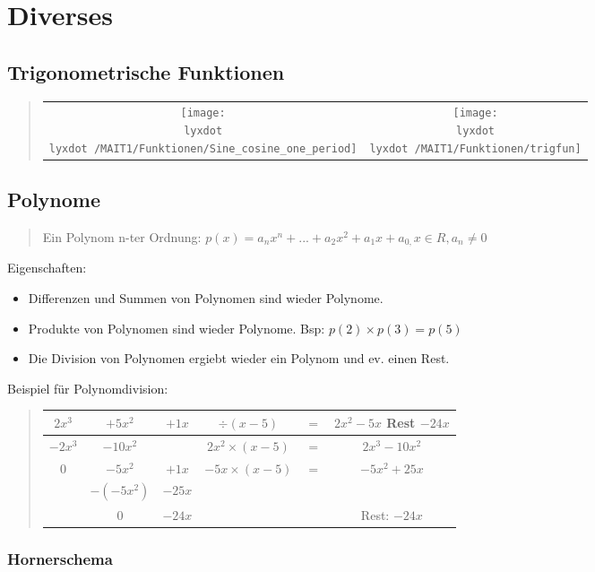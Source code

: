 
\section*{Diverses}


\subsection*{Trigonometrische Funktionen}
\begin{quote}
\begin{tabular}{cc}
\texttt{[image: \\lyxdot \\lyxdot /MAIT1/Funktionen/Sine\_cosine\_one\_period]} & \texttt{[image: \\lyxdot \\lyxdot /MAIT1/Funktionen/trigfun]}\tabularnewline
\end{tabular}
\end{quote}

\subsection*{Polynome}
\begin{quote}
Ein Polynom n-ter Ordnung: $p(x)=a_{n}x^{n}+...+a_{2}x^{2}+a_{1}x+a_{0,}x\in R,a_{n}\neq0$
\end{quote}
Eigenschaften:
\begin{itemize}
\item Differenzen und Summen von Polynomen sind wieder Polynome.
\item Produkte von Polynomen sind wieder Polynome. Bsp: $p(2)\times p(3)=p(5)$
\item Die Division von Polynomen ergiebt wieder ein Polynom und ev. einen
Rest.
\end{itemize}
Beispiel für Polynomdivision:
\begin{verse}
\begin{tabular}{cccccc}
$2x$$^{3}$ & $+5x$$^{2}$ & $+1x$ & $\div(x-5)$ & $=$ & $2x^{2}-5x$ Rest $-24x$\tabularnewline
\hline 
$-2x^{3}$ & $-10x^{2}$ &  & $2x^{2}\times(x-5)$ & $=$ & $2x^{3}-10x^{2}$\tabularnewline
\cline{1-2} 
$0$ & $-5x^{2}$ & $+1x$ & $-5x\times(x-5)$ & $=$ & $-5x^{2}+25x$\tabularnewline
\cline{2-3} 
 & $-(-5x^{2})$ & $-25x$ &  &  & \tabularnewline
\cline{2-3} 
 & $0$ & $-24x$ &  &  & Rest: $-24x$\tabularnewline
\end{tabular}
\end{verse}

\subsubsection*{Hornerschema}

